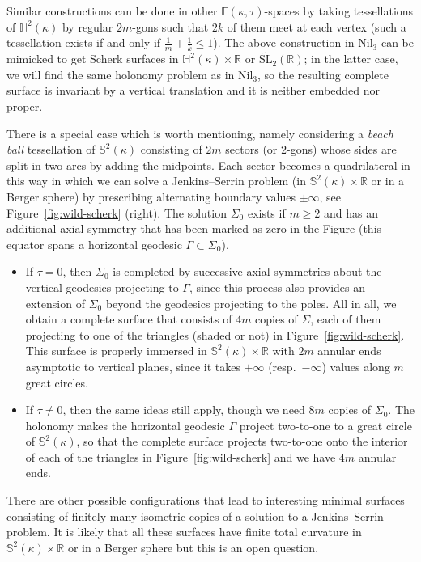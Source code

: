 \documentclass[a4paper,10pt,reqno]{amsart}
\newcommand{\R}{\mathbb{R}}
\newcommand{\E}{\mathbb{E}}
\theoremstyle{definition}
\theoremstyle{remark}
\numberwithin{equation}{section}
\begin{document}
Similar constructions can be done in other $\E(\kappa,\tau)$-spaces by taking tessellations of $\mathbb{H}^2(\kappa)$ by regular $2m$-gons such that $2k$ of them meet at each vertex (such a tessellation exists if and only if $\frac{1}{m}+\frac{1}{k}\leq 1$). The above construction in $\mathrm{Nil}_3$ can be mimicked to get Scherk surfaces in $\mathbb{H}^2(\kappa)\times\mathbb{R}$ or $\widetilde{\mathrm{SL}}_2(\mathbb{R})$; in the latter case, we will find the same holonomy problem as in $\mathrm{Nil}_3$, so the resulting complete surface is invariant by a vertical translation and it is neither embedded nor proper. 

There is a special case which is worth mentioning, namely considering a \emph{beach ball} tessellation of $\mathbb{S}^2(\kappa)$ consisting of $2m$ sectors (or $2$-gons) whose sides are split in two arcs by adding the midpoints. Each sector becomes a quadrilateral in this way in which we can solve a Jenkins--Serrin problem (in $\mathbb{S}^2(\kappa)\times\R$ or in a Berger sphere) by prescribing alternating boundary values $\pm\infty$, see Figure~\ref{fig:wild-scherk} (right). The solution $\Sigma_0$ exists if $m\geq 2$ and has an additional axial symmetry that has been marked as zero in the Figure (this equator spans a horizontal geodesic $\Gamma\subset\Sigma_0$).
\begin{itemize}
	\item If $\tau=0$, then $\Sigma_0$ is completed by successive axial symmetries about the vertical geodesics projecting to $\Gamma$, since this process also provides an extension of $\Sigma_0$ beyond the geodesics projecting to the poles. All in all, we obtain a complete surface that consists of $4m$ copies of $\Sigma$, each of them projecting to one of the triangles (shaded or not) in Figure~\ref{fig:wild-scherk}. This surface is properly immersed in $\mathbb{S}^2(\kappa)\times\R$ with $2m$ annular ends asymptotic to vertical planes, since it takes $+\infty$ (resp.\ $-\infty$) values along $m$ great circles. 
	\item If $\tau\neq 0$, then the same ideas still apply, though we need $8m$ copies of $\Sigma_0$. The holonomy makes the horizontal geodesic $\Gamma$ project two-to-one to a great circle of $\mathbb{S}^2(\kappa)$, so that the complete surface projects two-to-one onto the interior of each of the triangles in Figure~\ref{fig:wild-scherk} and we have $4m$ annular ends.
\end{itemize}
There are other possible configurations that lead to interesting minimal surfaces consisting of finitely many isometric copies of a solution to a Jenkins--Serrin problem. It is likely that all these surfaces have finite total curvature in $\mathbb{S}^2(\kappa)\times\R$ or in a Berger sphere but this is an open question.
\end{document}

